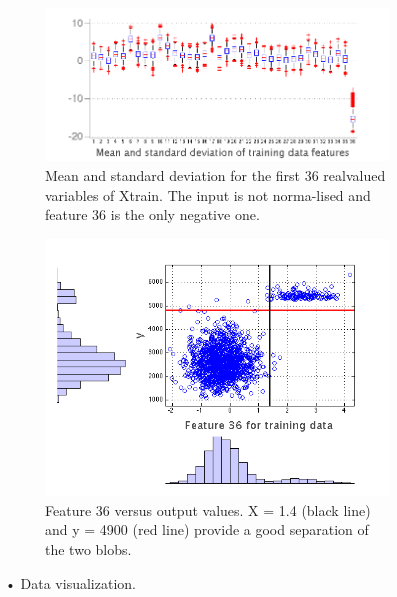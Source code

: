 \documentclass{article} %
\begin{document}

\begin{figure}[h]
  \begin{subfigure}[b]{0.5\textwidth}
   \includegraphics[width=\textwidth]{figures/dist_regression.png}
    \caption{Mean and standard deviation for the first 36 real\newline valued variables of Xtrain. The input is not norma-\newline lised and feature 36 is the only negative one.}
    \label{fig:dist_regression}
  \end{subfigure}
  \begin{subfigure}[b]{0.5\textwidth}
    \includegraphics[width=\textwidth]{figures/feature36.png}
    \caption{Feature 36 versus output values. X = 1.4 (black line) and y = 4900 (red line)  provide a good separation of the two blobs.}
    \label{fig:feature36}
  \end{subfigure}
  \caption{• Data visualization. }
\end{figure}
\end{document}
